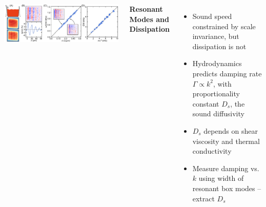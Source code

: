 \documentclass[26pt, paperwidth=36in,paperheight=48in]{tikzposter} %
\newcommand{\myfont}{\fontsize{24}{30}\selectfont}
\begin{document}
\begin{columns}
{\begin{minipage}{0.3\textwidth}
		\vspace{1.5cm}
		\hspace{-1cm}
		\includegraphics[width=\textwidth,
		trim=6.2cm 0cm 0cm 0cm,clip]{figures/sound_diff_disp.pdf}
		
	\end{minipage}

	\vspace{1.4cm}
	\begin{minipage}{0.2\textwidth}
		\textbf{Resonant Modes and Dissipation}
		\vspace{1cm}
		\myfont
		\begin{minipage}{0.63\textwidth}
			\vspace{1.2cm}
			\begin{itemize}
				\item Sound speed constrained by scale invariance, but dissipation is not
				
				\item Hydrodynamics predicts damping rate $\Gamma \propto k^2$, with proportionality constant $D_s$, the sound diffusivity
				
				\item $D_s$ depends on shear viscosity and thermal conductivity 
				
				\item Measure damping vs. $k$ using width of resonant box modes -- extract $D_s$
			\end{itemize}
		\end{minipage}
		

\end{minipage}}
\end{columns}
\end{document}
